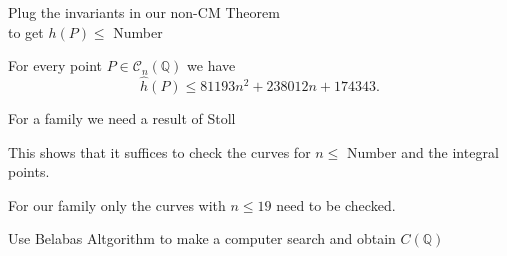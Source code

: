 \documentclass[handout]{beamer}
\newcommand{\qe}{\mathbb{Q}}
\newcommand{\Ci}{\mathcal{C}}
\begin{document}
\begin{frame}

\begin{alertblock}{Plug the invariants in our non-CM Theorem\\
 to get
$h(P)\le$ Number}\end{alertblock}

For every point $P\in \Ci_n(\qe)$ we have
$$\hat h(P)\leq 81193 n^2 + 238012 n + 174343.$$



\pause

 \begin{alertblock} {For a family we need  a result of Stoll} \end{alertblock}

 
 This  shows that it suffices to check the curves for $n\le$ Number  and the integral points.
  
 For our family only the curves with $n\leq 19$ need to be checked.

\pause

\begin{alertblock}{Use Belabas Altgorithm to make a computer search and obtain $C({\mathbb{Q}})$}  \end{alertblock}
\end{frame}
\end{document}
